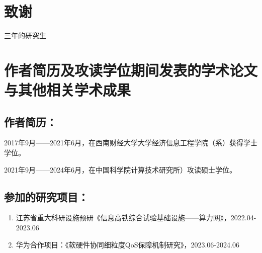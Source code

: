 \chapter[致谢]{致\quad 谢}%

三年的研究生


\chapter{作者简历及攻读学位期间发表的学术论文与其他相关学术成果}

\section*{作者简历：}

2017年9月——2021年6月，在西南财经大学大学经济信息工程学院（系）获得学士学位。

2021年9月——2024年6月，在中国科学院计算技术研究所）攻读硕士学位。

\section*{参加的研究项目：}

\begin{enumerate}
    \item 江苏省重大科研设施预研《信息高铁综合试验基础设施——算力网》，2022.04-2023.06
    \item 华为合作项目：《软硬件协同细粒度QoS保障机制研究》，2023.06-2024.06
\end{enumerate}


\cleardoublepage[plain]%

